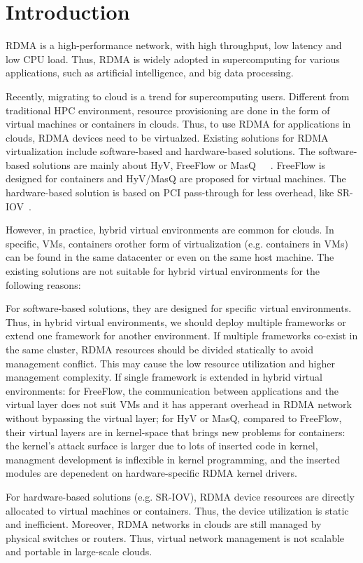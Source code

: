 \section{Introduction}
RDMA is a high-performance network,  with high throughput, low latency and low CPU load. Thus, RDMA is widely adopted in supercomputing for various applications,  such as artificial intelligence, and big data processing. 

Recently,  migrating to cloud is a trend for supercomputing users. Different from traditional HPC environment, resource provisioning are done in the form of virtual machines or containers in clouds. Thus, to  use RDMA for applications in clouds, RDMA devices need to be virtualzed. Existing solutions for RDMA virtualization include software-based and hardware-based solutions. The software-based solutions are mainly about HyV, FreeFlow or MasQ~\cite{pfefferle2015hybrid}~\cite{kim2019freeflow}~\cite{he2020masq}. FreeFlow is  designed for containers and HyV/MasQ are proposed for virtual machines. The hardware-based solution is based on PCI pass-through for less overhead, like SR-IOV~\cite{sr-iov}. 

However, in practice, hybrid virtual environments are common for clouds. In specific, VMs, containers orother form of virtualization (e.g. containers in VMs) can be found in the same datacenter or even on the same host machine. The existing solutions are not suitable for hybrid virtual environments for the following reasons:

For software-based solutions, they are designed for specific virtual environments. Thus, in hybrid virtual environments, we should deploy multiple frameworks or extend one framework for another environment. If multiple frameworks co-exist in the same cluster, RDMA resources should be divided statically to avoid management conflict. This may cause the low resource utilization and higher management complexity. If single framework is extended in hybrid virtual environments: for FreeFlow,  the communication between applications and the virtual layer does not suit VMs and it has apperant overhead in RDMA network without bypassing the virtual layer; for HyV or MasQ, compared to FreeFlow, their virtual layers are in kernel-space that brings new problems for containers: the kernel's attack surface is larger due to lots of inserted code in kernel, managment development is inflexible in kernel programming, and the inserted modules are depenedent on hardware-specific RDMA kernel drivers.

For hardware-based solutions (e.g. SR-IOV), RDMA device resources are directly allocated to virtual machines or containers. Thus, the device utilization is static and inefficient. Moreover,  RDMA networks in clouds are still managed by physical switches or routers. Thus, virtual network management is not scalable and portable in large-scale clouds.

